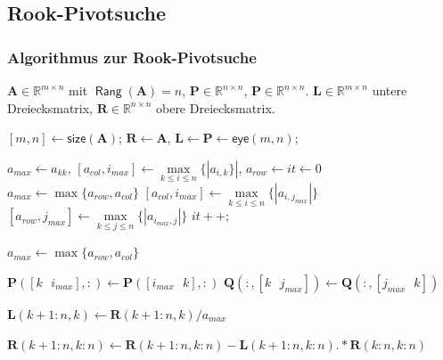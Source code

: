 \documentclass[10pt]{beamer} %
\DeclareMathOperator{\Rang}{\mathsf{Rang}}
\newcommand{\bfA}{{\mathbf A}}
\newcommand{\bfL}{{\mathbf L}}
\newcommand{\bfP}{{\mathbf P}}
\newcommand{\bfQ}{{\mathbf Q}}
\newcommand{\bfR}{{\mathbf R}}
\begin{document}
\subsection{Rook-Pivotsuche}
\begin{frame}[shrink=12]
  \frametitle{Algorithmus zur Rook-Pivotsuche}
  \setcounter{algorithm}{0} %
  \begin{algorithm}[H]
  \caption{Rook Pivotisierung%
    \label{alg:rook_pivoting}}
  \begin{algorithmic}[1]

		\REQUIRE $\bfA\in\mathbb{R}^{m\times n}$ mit $\Rang(\bfA)=n$, $\bfP\in\mathbb{R}^{n\times n}$, $\bfP\in\mathbb{R}^{n\times n}$.
		\ENSURE $\bfL\in\mathbb{R}^{m\times n}$ untere Dreiecksmatrix, $\bfR\in\mathbb{R}^{n\times n}$ obere Dreiecksmatrix.

		\STATE \alert<2>{$[m,n] \leftarrow \textsf{size}(\bfA)$;}
		\STATE \alert<3>{$\bfR \leftarrow \bfA$,} \alert<4>{$\bfL \leftarrow \bfP \leftarrow \textsf{eye}(m,n)$;}


			\STATE \alert<5>{$a_{max} \leftarrow a_{kk}$, $[a_{col}, i_{max}] \leftarrow \max\limits_{k \leq i \leq n}\{|a_{i,k}\}|$, $a_{row} \leftarrow it \leftarrow 0$}
				\STATE \alert<6>{$a_{max} \leftarrow \max\{a_{row}, a_{col}\}$}
				\STATE \alert<7>{$[a_{col}, i_{max}] \leftarrow \max\limits_{k \leq i \leq n}\{|a_{i,j_{max}}|\}$}
				\ELSE
				\STATE \alert<8>{$[a_{row}, j_{max}] \leftarrow \max\limits_{k \leq j \leq n}\{|a_{i_{max},j}|\}$}
				\ENDIF
				\STATE \alert<9>{$it++$;}
			\ENDWHILE

			\STATE \alert<10>{$a_{max} \leftarrow \max\{a_{row}, a_{col}\}$}

				\STATE \alert<11>{$\bfP([k\textsf{ }i_{max}],:) \leftarrow \bfP([i_{max}\textsf{ }k],:)$}
			\ENDIF
				\STATE \alert<12>{$\bfQ(:,[k\textsf{ }j_{max}]) \leftarrow \bfQ(:,[j_{max}\textsf{ }k])$}
			\ENDIF

			\STATE \alert<13>{$\bfL(k+1:n,k) \leftarrow \bfR(k+1:n,k)/a_{max}$}

			\STATE \alert<14>{$\bfR(k+1:n,k:n) \leftarrow \bfR(k+1:n,k:n) - \bfL(k+1:n,k:n).*\bfR(k:n,k:n)$}

		\ENDFOR
  \end{algorithmic}
\end{algorithm}

\end{frame}
\end{document}
